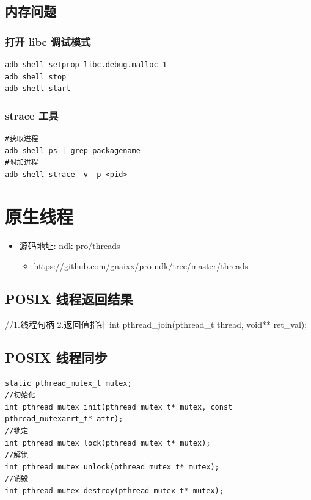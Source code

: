 \documentclass[9pt, b5paper]{article}
\begin{document}
\subsection{内存问题}
\label{sec-3-4}
\subsubsection{打开 libc 调试模式}
\label{sec-3-4-1}
\begin{verbatim}
adb shell setprop libc.debug.malloc 1
adb shell stop
adb shell start
\end{verbatim}
\subsubsection{strace 工具}
\label{sec-3-4-2}
\begin{verbatim}
#获取进程
adb shell ps | grep packagename
#附加进程
adb shell strace -v -p <pid>
\end{verbatim}

\section{原生线程}
\label{sec-4}
\begin{itemize}
\item 源码地址: ndk-pro/threads
\begin{itemize}
\item \url{https://github.com/gnaixx/pro-ndk/tree/master/threads}
\end{itemize}
\end{itemize}
\subsection{POSIX 线程返回结果}
\label{sec-4-1}

//1.线程句柄 2.返回值指针
int pthread\_join(pthread\_t thread, void** ret\_val);
\subsection{POSIX 线程同步}
\label{sec-4-2}
\begin{verbatim}
static pthread_mutex_t mutex;
//初始化
int pthread_mutex_init(pthread_mutex_t* mutex, const pthread_mutexarrt_t* attr);
//锁定
int pthread_mutex_lock(pthread_mutex_t* mutex);
//解锁
int pthread_mutex_unlock(pthread_mutex_t* mutex);
//销毁
int pthread_mutex_destroy(pthread_mutex_t* mutex);
\end{verbatim}
\end{document}
